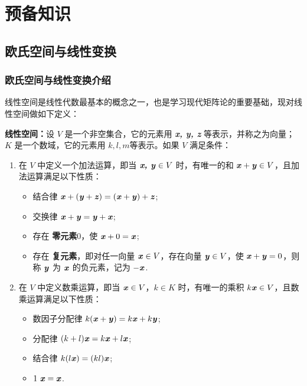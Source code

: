 \section{预备知识}
\fontsize{12pt}{14pt}\selectfont
\songti
    \subsection{欧氏空间与线性变换}
        \subsubsection{欧氏空间与线性变换介绍}
            \par 线性空间是线性代数最基本的概念之一，也是学习现代矩阵论的重要基础，现对线性空间做如下定义：
            \par \textbf{线性空间：}设 $V$ 是一个非空集合，它的元素用 \textbf{\textit{x, y, z}} 等表示，并称之为向量； $K$ 是一个数域，它的元素用 $k, l, m$等表示。如果 $V$ 满足条件：
            \begin{enumerate}
                \item 在 $V$ 中定义一个加法运算，即当 $\textbf{\textit{x, y}} \in V$ 时，有唯一的和 $\textbf{\textit{x}} + \textbf{\textit{y}} \in V$，且加法运算满足以下性质：
                    \begin{itemize}
                        \item 结合律 $\textbf{\textit{x}} + (\textbf{\textit{y}} + \textbf{\textit{z}}) = (\textbf{\textit{x}} + \textbf{\textit{y}}) + \textbf{\textit{z}}$;
                        \item 交换律 $\textbf{\textit{x}} + \textbf{\textit{y}} = \textbf{\textit{y}} + \textbf{\textit{x}}$;
                        \item 存在 \textbf{零元素}$0$，使 $\textbf{\textit{x}} + 0 = \textbf{\textit{x}}$;
                        \item 存在 \textbf{复元素}，即对任一向量 $\textbf{\textit{x}} \in V$，存在向量 $\textbf{\textit{y}} \in V$，使 $\textbf{\textit{x}} + \textbf{\textit{y}} = 0$，则称 $\textbf{\textit{y}}$ 为 $\textbf{\textit{x}}$ 的负元素，记为 $-\textbf{\textit{x}}$.
                    \end{itemize}
                \item 在 $V$ 中定义数乘运算，即当 $\textbf{\textit{x}} \in V$，$k \in K$ 时，有唯一的乘积 $k\textbf{\textit{x}} \in V$，且数乘运算满足以下性质：
                    \begin{itemize}
                        \item 数因子分配律 $k(\textbf{\textit{x}} + \textbf{\textit{y}}) = k\textbf{\textit{x}} + k\textbf{\textit{y}}$;
                        \item 分配律 $(k + l)\textbf{\textit{x}} = k\textbf{\textit{x}} + l\textbf{\textit{x}}$;
                        \item 结合律 $k(l\textbf{\textit{x}}) = (kl)\textbf{\textit{x}}$;
                        \item $1 \ \textbf{\textit{x}} = \textbf{\textit{x}}$.
                    \end{itemize}
            \end{enumerate}
